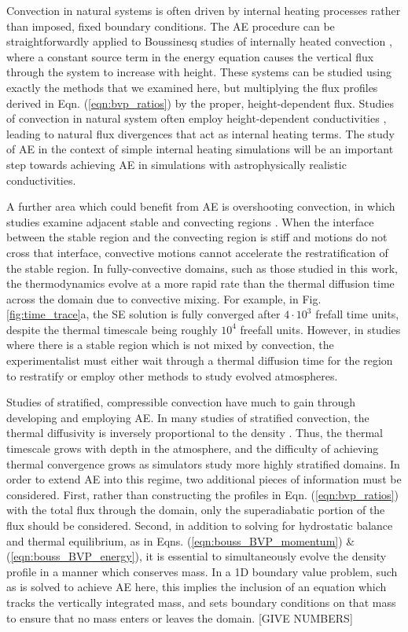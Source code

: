 \documentclass[aps, pre, onecolumn, nofootinbib, notitlepage, groupedaddress, amsfonts, amssymb, amsmath, longbibliography]{revtex4-1}
\begin{document}
Convection in natural systems is often driven by internal heating processes
rather than imposed, fixed boundary conditions. The AE procedure can be straightforwardly
applied to Boussinesq studies of internally heated convection \cite{goluskin2016},
where a constant source term in the energy equation causes 
the vertical flux through the system to increase with height.
These systems can be
studied using exactly the methods that we examined here, but 
multiplying the flux profiles derived
in Eqn. (\ref{eqn:bvp_ratios}) by the proper, height-dependent flux. Studies of
convection in natural system often employ height-dependent conductivities
\cite{brandenburg2016, kapyla&all2017}, leading
to natural flux divergences that act as internal heating terms.
The study
of AE in the context of simple internal heating simulations will be an important step
towards achieving AE in simulations with astrophysically realistic conductivities.

A further area which could benefit from AE is overshooting convection, in which
studies examine adjacent stable and convecting regions
\cite{hurlburt&all1986, brandenburg&all2005, couston&all2017}.
When the interface between the stable region
and the convecting region is stiff and motions do not cross that interface,
convective motions cannot accelerate the restratification of the stable region.
In fully-convective domains, such as those studied in this work, the thermodynamics evolve
at a more rapid rate than the thermal diffusion time across the domain due to
convective mixing.  For example, in Fig. \ref{fig:time_trace}a,
the SE solution is fully converged after $4\cdot 10^3$ frefall time units,
despite the thermal timescale being roughly $10^4$ freefall units. However, in 
studies where there is a stable region which is not mixed by convection, the experimentalist
must either wait through a thermal diffusion time for the region to restratify
or employ other methods \cite{couston&all2017} to study evolved atmospheres.


Studies of stratified, compressible convection have much to gain through
developing and employing AE.
In many studies of stratified convection, the thermal diffusivity
is inversely proportional to the density \cite{anders&brown2017}. Thus, the
thermal timescale grows with depth in the atmosphere, and
the difficulty of achieving thermal convergence grows as simulators study more highly
stratified domains.
In order to extend AE into this regime, two additional pieces of information must be considered.
First, rather than constructing the profiles in Eqn. (\ref{eqn:bvp_ratios})
with the total flux through the domain, only the superadiabatic portion of
the flux should be considered.
Second, in addition to solving for
hydrostatic balance and thermal equilibrium, as in Eqns. (\ref{eqn:bouss_BVP_momentum})
\& (\ref{eqn:bouss_BVP_energy}), it is essential to simultaneously evolve the density
profile in a manner which conserves mass.  In a 1D boundary value problem, such as
is solved to achieve AE here, this implies the inclusion of an equation which tracks
the vertically integrated mass, and sets boundary conditions on that mass to ensure
that no mass enters or leaves the domain. [GIVE NUMBERS] 
\end{document}

